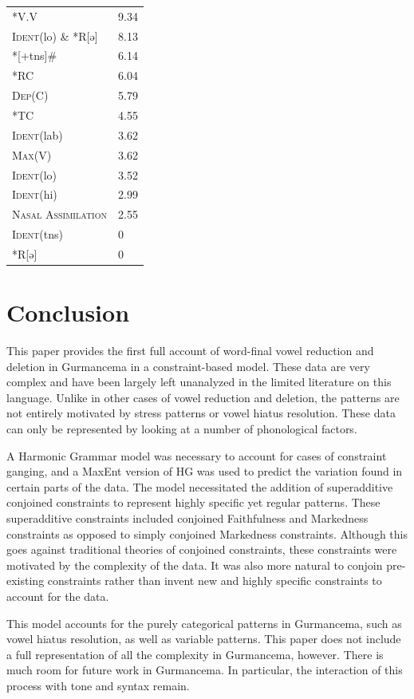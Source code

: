 \documentclass[output=paper,newtxmath,modfonts,nonflat,draftmode]{langsci/langscibook}
\begin{document}
\ea \label{ex:baird:17}
\begin{tabular}[t]{ll}
	*V.V &  9.34 \\
	\textsc{Ident}(lo) \&  *R[ə] &  8.13 \\
	*[+tns]\# &  6.14 \\
	*RC &  6.04\\
	\textsc{Dep}(C) &  5.79\\
	*TC &  4.55\\
	\textsc{Ident}(lab) &  3.62\\
	\textsc{Max}(V) &  3.62\\
	\textsc{Ident}(lo) &  3.52\\
	\textsc{Ident}(hi) &  2.99\\
	\textsc{Nasal Assimilation} &  2.55\\
	\textsc{Ident}(tns) &  0\\
	*R[ə] &  0\\
\end{tabular}
\z

\section{Conclusion}\label{sec:baird:6}

This paper provides the first full account of word-final vowel reduction and deletion in Gurmancema in a constraint-based model. These data are very complex and have been largely left unanalyzed in the limited literature on this language. Unlike in other cases of vowel reduction and deletion, the patterns are not entirely motivated by stress patterns or vowel hiatus resolution. These data can only be represented by looking at a number of phonological factors.  
	
A Harmonic Grammar model was necessary to account for cases of constraint ganging, and a MaxEnt version of HG was used to predict the variation found in certain parts of the data. The model necessitated the addition of superadditive conjoined constraints to represent highly specific yet regular patterns. These superadditive constraints included conjoined Faithfulness and Markedness constraints as opposed to simply conjoined Markedness constraints. Although this goes against traditional theories of conjoined constraints, these constraints were motivated by the complexity of the data. It was also more natural to conjoin pre-existing constraints rather than invent new and highly specific constraints to account for the data.   

This model accounts for the purely categorical patterns in Gurmancema, such as vowel hiatus resolution, as well as variable patterns. This paper does not include a full representation of all the complexity in Gurmancema, however. There is much room for future work in Gurmancema. In particular, the interaction of this process with tone and syntax remain. 
\end{document}
